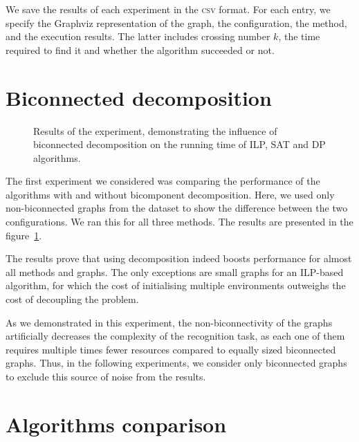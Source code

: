 We save the results of each experiment in the \textsc{csv} format. For each entry, we specify the Graphviz representation of the graph, the configuration, the method, and the execution results. The latter includes crossing number \(k\), the time required to find it and whether the algorithm succeeded or not.


\section{Biconnected decomposition}

\begin{figure}[tbh]
    \centering
    \captionsetup{subrefformat=parens}
     \hfill
     \hfill
    \caption{Results of the experiment, demonstrating the influence of biconnected decomposition on the running time of ILP, SAT and DP algorithms.}
    \label{fig:bctree-results}
\end{figure}

The first experiment we considered was comparing the performance of the algorithms with and without bicomponent decomposition. Here, we used only non-biconnected graphs from the dataset to show the difference between the two configurations. We ran this for all three methods. The results are presented in the figure~\ref{fig:bctree-results}.

The results prove that using decomposition indeed boosts performance for almost all methods and graphs. The only exceptions are small graphs for an ILP-based algorithm, for which the cost of initialising multiple environments outweighs the cost of decoupling the problem.

As we demonstrated in this experiment, the non-biconnectivity of the graphs artificially decreases the complexity of the recognition task, as each one of them requires multiple times fewer resources compared to equally sized biconnected graphs. Thus, in the following experiments, we consider only biconnected graphs to exclude this source of noise from the results.


\section{Algorithms conparison}

